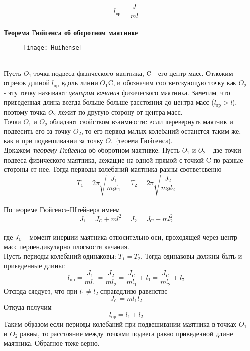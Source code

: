 \documentclass[a4paper, 12pt]{article}
\begin{document}
\begin{equation}
l_{пр} = \frac{J}{ml}
\end{equation}\\
\textbf{Теорема Гюйгенса об оборотном маятнике}\\
\begin{figure}[h!]
	\centering
	\texttt{[image: Huihense]}
	\caption{}
\end{figure}\\
Пусть $O_1$ точка подвеса физического маятника, 
C - его центр масс. Отложим отрезок длиной $l_{пр}$ вдоль линии $O_1$C, и обозначим соответсвующую точку как $O_2$ - эту точку называют \textit{центром качания} физического маятника. Заметим, что приведенная длина всегда больше больше расстояния до центра масс ($l_{пр} > l$), поэтому точка $O_2$ лежит по другую сторону от центра масс.\\ Точки $O_1$ и $O_2$ обладают свойством взаимности: если перевернуть маятник и подвесить его за точку $O_2$, то его период малых колебаний останется таким же, как и при подвешивании за точку $O_1$ (теоема Гюйгенса).\\
Докажем \textit{теорему Гюйгенса} об оборотном маятнике. Пусть $O_1$ и $O_2$ - две точки подвеса физического маятника, лежащие на одной прямой с точкой C по разные стороны от нее. Тогда периоды колебаний маятника равны соответсвенно
\begin{equation}
	T_1 = 2\pi\sqrt{\frac{J_1}{mgl_1}} \hspace{16pt}
	T_2 = 2\pi\sqrt{\frac{J_2}{mgl_2}}
\end{equation} \\
По теореме Гюйгенса-Штейнера имеем
\begin{equation}
	J_1 = J_C + ml_1^2 \hspace{16pt} J_2 = J_C + ml_2^2	
\end{equation} \\
где $J_C$ - момент инерции маятника относительно оси, проходящей через центр масс перпендикулярно плоскости качания.\\
Пусть периоды колебаний одинаковы: $T_1 = T_2$. Тогда одинаковы должны быть и приведенные длины:
$$ l_{пр} = \frac{J_1}{ml_1} = \frac{J_2}{ml_2} = \frac{J_C}{ml_1} + l_1 = \frac{J_C}{ml_2} + l_2$$
Отсюда следует, что при $l_1 \neq l_2$ справедливо равенство 
\begin{equation}
	J_C = ml_1l_2
\end{equation}
Откуда получим 
\begin{equation}
	l_{пр} = l_1 + l_2
\end{equation}
Таким образом если периоды колебаний при подвешивании маятника в точках $O_1$ и $O_2$ равны, то расстояние между точками подвеса равно приведенной длине маятника. Обратное тоже верно. \\\\\\
\end{document}
